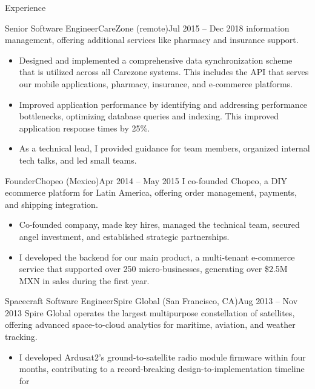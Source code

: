 \documentclass[colibri]{mcdowellcv}
\begin{document}
\begin{cvsection}{Experience}
\begin{cvsubsection}{Senior Software Engineer}{CareZone (remote)}{Jul 2015 -- Dec 2018}
    information management, offering additional services like pharmacy and insurance
    support.
    \newline
		\begin{itemize}
    \item
      Designed and implemented a comprehensive data synchronization scheme that is
      utilized across all Carezone systems. This includes the API that serves our
      mobile applications, pharmacy, insurance, and e-commerce platforms.
    \item
      Improved application performance by identifying and addressing performance
      bottlenecks, optimizing database queries and indexing. This improved
      application response times by 25\%.
    \item
      As a technical lead, I provided guidance for team members, organized
      internal tech talks, and led small teams.
		\end{itemize}
	\end{cvsubsection}
	\begin{cvsubsection}{Founder}{Chopeo (Mexico)}{Apr 2014 -- May 2015}
    I co-founded Chopeo, a DIY ecommerce platform for Latin America, offering
    order management, payments, and shipping integration.\
    \newline
		\begin{itemize}
    \item
      Co-founded company, made key hires, managed the technical team, secured
      angel investment, and established strategic partnerships.
    \item
      I developed the backend for our main product, a multi-tenant e-commerce service
      that supported over 250 micro-businesses, generating over \$2.5M MXN in
      sales during the first year.
		\end{itemize}
	\end{cvsubsection}
	\begin{cvsubsection}{Spacecraft Software Engineer}{Spire Global (San Francisco, CA)}{Aug 2013 -- Nov 2013}
    Spire Global operates the largest multipurpose constellation of satellites,
    offering advanced space-to-cloud analytics for maritime, aviation, and weather
    tracking.
    \newline
    \begin{itemize}
    \item
      I developed Ardusat2's ground-to-satellite radio module firmware within four
      months, contributing to a record-breaking design-to-implementation timeline for

\end{itemize}
\end{cvsubsection}
\end{cvsection}
\end{document}
